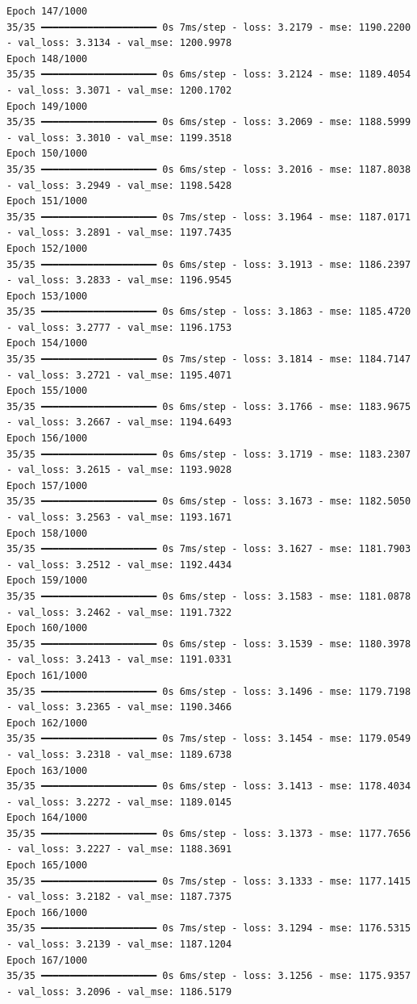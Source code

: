 \documentclass[
  letterpaper,
  DIV=11,
  numbers=noendperiod]{scrreprt}
\begin{document}
\begin{verbatim}
Epoch 147/1000
35/35 ━━━━━━━━━━━━━━━━━━━━ 0s 7ms/step - loss: 3.2179 - mse: 1190.2200 - val_loss: 3.3134 - val_mse: 1200.9978
Epoch 148/1000
35/35 ━━━━━━━━━━━━━━━━━━━━ 0s 6ms/step - loss: 3.2124 - mse: 1189.4054 - val_loss: 3.3071 - val_mse: 1200.1702
Epoch 149/1000
35/35 ━━━━━━━━━━━━━━━━━━━━ 0s 6ms/step - loss: 3.2069 - mse: 1188.5999 - val_loss: 3.3010 - val_mse: 1199.3518
Epoch 150/1000
35/35 ━━━━━━━━━━━━━━━━━━━━ 0s 6ms/step - loss: 3.2016 - mse: 1187.8038 - val_loss: 3.2949 - val_mse: 1198.5428
Epoch 151/1000
35/35 ━━━━━━━━━━━━━━━━━━━━ 0s 7ms/step - loss: 3.1964 - mse: 1187.0171 - val_loss: 3.2891 - val_mse: 1197.7435
Epoch 152/1000
35/35 ━━━━━━━━━━━━━━━━━━━━ 0s 6ms/step - loss: 3.1913 - mse: 1186.2397 - val_loss: 3.2833 - val_mse: 1196.9545
Epoch 153/1000
35/35 ━━━━━━━━━━━━━━━━━━━━ 0s 6ms/step - loss: 3.1863 - mse: 1185.4720 - val_loss: 3.2777 - val_mse: 1196.1753
Epoch 154/1000
35/35 ━━━━━━━━━━━━━━━━━━━━ 0s 7ms/step - loss: 3.1814 - mse: 1184.7147 - val_loss: 3.2721 - val_mse: 1195.4071
Epoch 155/1000
35/35 ━━━━━━━━━━━━━━━━━━━━ 0s 6ms/step - loss: 3.1766 - mse: 1183.9675 - val_loss: 3.2667 - val_mse: 1194.6493
Epoch 156/1000
35/35 ━━━━━━━━━━━━━━━━━━━━ 0s 6ms/step - loss: 3.1719 - mse: 1183.2307 - val_loss: 3.2615 - val_mse: 1193.9028
Epoch 157/1000
35/35 ━━━━━━━━━━━━━━━━━━━━ 0s 6ms/step - loss: 3.1673 - mse: 1182.5050 - val_loss: 3.2563 - val_mse: 1193.1671
Epoch 158/1000
35/35 ━━━━━━━━━━━━━━━━━━━━ 0s 7ms/step - loss: 3.1627 - mse: 1181.7903 - val_loss: 3.2512 - val_mse: 1192.4434
Epoch 159/1000
35/35 ━━━━━━━━━━━━━━━━━━━━ 0s 6ms/step - loss: 3.1583 - mse: 1181.0878 - val_loss: 3.2462 - val_mse: 1191.7322
Epoch 160/1000
35/35 ━━━━━━━━━━━━━━━━━━━━ 0s 6ms/step - loss: 3.1539 - mse: 1180.3978 - val_loss: 3.2413 - val_mse: 1191.0331
Epoch 161/1000
35/35 ━━━━━━━━━━━━━━━━━━━━ 0s 6ms/step - loss: 3.1496 - mse: 1179.7198 - val_loss: 3.2365 - val_mse: 1190.3466
Epoch 162/1000
35/35 ━━━━━━━━━━━━━━━━━━━━ 0s 7ms/step - loss: 3.1454 - mse: 1179.0549 - val_loss: 3.2318 - val_mse: 1189.6738
Epoch 163/1000
35/35 ━━━━━━━━━━━━━━━━━━━━ 0s 6ms/step - loss: 3.1413 - mse: 1178.4034 - val_loss: 3.2272 - val_mse: 1189.0145
Epoch 164/1000
35/35 ━━━━━━━━━━━━━━━━━━━━ 0s 6ms/step - loss: 3.1373 - mse: 1177.7656 - val_loss: 3.2227 - val_mse: 1188.3691
Epoch 165/1000
35/35 ━━━━━━━━━━━━━━━━━━━━ 0s 7ms/step - loss: 3.1333 - mse: 1177.1415 - val_loss: 3.2182 - val_mse: 1187.7375
Epoch 166/1000
35/35 ━━━━━━━━━━━━━━━━━━━━ 0s 7ms/step - loss: 3.1294 - mse: 1176.5315 - val_loss: 3.2139 - val_mse: 1187.1204
Epoch 167/1000
35/35 ━━━━━━━━━━━━━━━━━━━━ 0s 6ms/step - loss: 3.1256 - mse: 1175.9357 - val_loss: 3.2096 - val_mse: 1186.5179

\end{verbatim}
\end{document}
